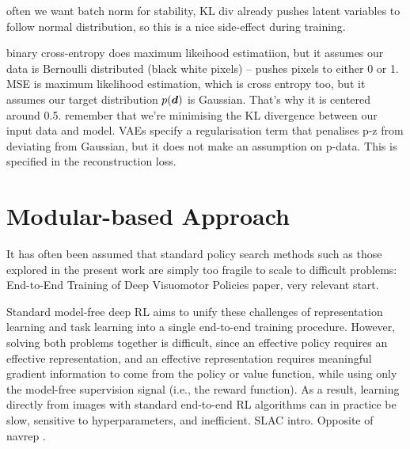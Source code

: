 often we want batch norm for stability, KL div already pushes latent variables to follow normal distribution, so this is a nice side-effect during training.


binary cross-entropy does maximum likeihood estimatiion, but it assumes our data is Bernoulli distributed (black white pixels) -- pushes pixels to either 0 or 1.
MSE is maximum likelihood estimation, which is cross entropy too, but it assumes our target distribution $p({\boldsymbol{d}})$ is Gaussian. That's why it is centered around 0.5.
remember that we're minimising the KL divergence between our input data and model. VAEs specify a regularisation term that penalises p-z from deviating from Gaussian, but it does not make an assumption on p-data. This is specified in the reconstruction loss.


\section{Modular-based Approach}
It has often been assumed that standard policy search methods such as those explored in the present
work are simply too fragile to scale to difficult problems: End-to-End Training of Deep Visuomotor Policies paper, very relevant start.

Standard model-free deep RL aims to unify these challenges of representation learning and task learning into a single end-to-end training procedure. However, solving both problems together is difficult, since an effective policy requires an effective representation, and an effective representation requires meaningful gradient information to come from the policy or value function, while using only the model-free supervision signal (i.e., the reward function). As a result, learning directly from images with standard end-to-end RL algorithms can in practice be slow, sensitive to hyperparameters, and inefficient. SLAC \cite{stochastic_latent_actor_critic} intro. Opposite of navrep \cite{NavRep_unsupervised}.